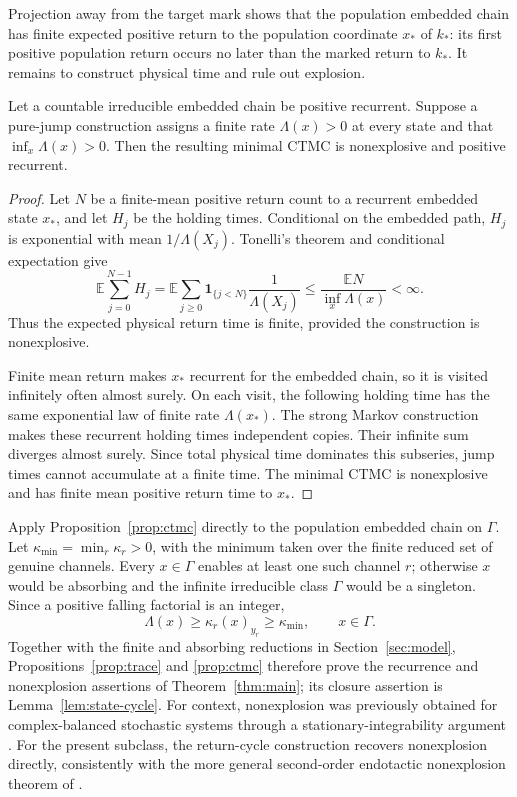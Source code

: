 Projection away from the target mark shows that the population embedded chain
has finite expected positive return to the population coordinate \(x_*\) of
\(k_*\): its first positive population return occurs no later than the marked
return to \(k_*\).
It remains to construct physical time and rule out explosion.

\begin{proposition}\label{prop:ctmc}
Let a countable irreducible embedded chain be positive recurrent.  Suppose a
pure-jump construction assigns a finite rate \(\Lambda(x)>0\) at every state
and that \(\inf_x\Lambda(x)>0\).  Then the resulting minimal CTMC is
nonexplosive and positive recurrent.
\end{proposition}

\begin{proof}
Let \(N\) be a finite-mean positive return count to a recurrent embedded state
\(x_*\), and let \(H_j\) be the holding times.  Conditional on the embedded
path, \(H_j\) is exponential with mean \(1/\Lambda(X_j)\).  Tonelli's theorem
and conditional expectation give
\[
 \mathbb E\sum_{j=0}^{N-1}H_j
 =\mathbb E\sum_{j\ge0}\mathbf1_{\{j<N\}}
   \frac1{\Lambda(X_j)}
 \le\frac{\mathbb EN}{\inf_x\Lambda(x)}<\infty.
\]
Thus the expected physical return time is finite, provided the construction
is nonexplosive.

Finite mean return makes \(x_*\) recurrent for the embedded chain, so it is
visited infinitely often almost surely.  On each visit, the following
holding time has the same exponential law of finite rate \(\Lambda(x_*)\).
The strong Markov construction makes these recurrent holding times
independent copies.  Their infinite sum diverges almost surely.  Since total
physical time dominates this subseries, jump times cannot accumulate at a
finite time.  The minimal CTMC is nonexplosive and has finite mean positive
return time to \(x_*\).
\end{proof}

Apply Proposition~\ref{prop:ctmc} directly to the population embedded chain on
\(\Gamma\).  Let \(\kappa_{\min}=\min_r\kappa_r>0\), with the minimum taken
over the finite reduced set of genuine channels.  Every \(x\in\Gamma\) enables
at least one such channel \(r\); otherwise \(x\) would be absorbing and the
infinite irreducible class \(\Gamma\) would be a singleton.  Since a positive
falling factorial is an integer,
\begin{equation}\label{eq:rate-lower}
  \Lambda(x)\ge\kappa_r(x)_{y_r}\ge\kappa_{\min},
  \qquad x\in\Gamma.
\end{equation}
Together with the finite and absorbing reductions in
Section~\ref{sec:model}, Propositions~\ref{prop:trace} and \ref{prop:ctmc}
therefore prove the recurrence and nonexplosion assertions of
Theorem~\ref{thm:main}; its closure assertion is
Lemma~\ref{lem:state-cycle}.  For context, nonexplosion was previously obtained for
complex-balanced stochastic systems through a stationary-integrability
argument \citep{AndersonCappellettiKoyamaKurtz2018}.  For the present subclass,
the return-cycle construction recovers nonexplosion directly, consistently
with the more general second-order endotactic nonexplosion theorem of
\citet{Xu2026}.


